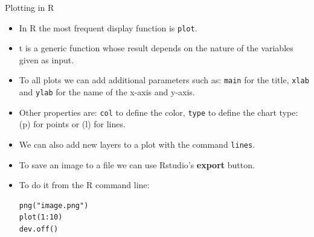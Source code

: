 \documentclass[handout]{beamer}
\begin{document}
\begin{frame}[fragile]{Plotting in R}
\scriptsize{
\begin{itemize}
 \item  In R the most frequent display function is \verb+plot+. 
 \item t is a generic function whose result depends on the nature of the variables given as input.  
 
 \item  To all plots we can add additional parameters such as: \verb+main+ for the title, \verb+xlab+ and \verb+ylab+ for the name of the x-axis and y-axis.
 
 \item Other properties are: \verb+col+ to define the color, \verb+type+ to define the chart type: (p) for points or (l) for lines.
 
 \item We can also add new layers to a plot with the command \verb+lines+.
 
 \item To save an image to a file we can use Rstudio's \textbf{export} button.
 
 \item To do it from the R command line:
 \begin{verbatim}
png("image.png")
plot(1:10)
dev.off() 
 \end{verbatim}

 


 
 
\end{itemize}


 
} 
\end{frame}
\end{document}
